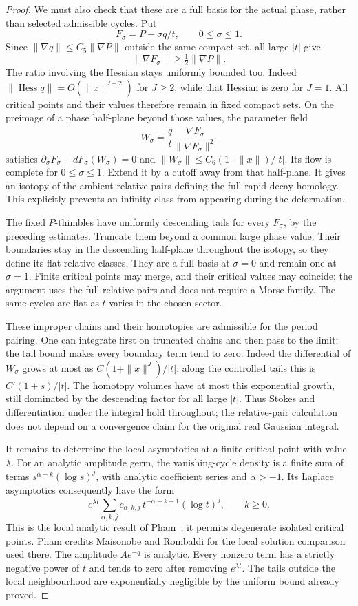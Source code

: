 \documentclass[11pt]{article}
\theoremstyle{definition}\newtheorem{definition}[theorem]{Definition}
\theoremstyle{remark}\newtheorem{remark}[theorem]{Remark}
\begin{document}
\begin{proof}
We must also check that these are a full basis for the actual phase,
rather than selected admissible cycles. Put
\[
 F_\sigma=P-\sigma q/t,\qquad 0\leq\sigma\leq1.
\]
Since $\|\nabla q\|\leq C_5\|\nabla P\|$ outside the same compact
set, all large $|t|$ give
\[
 \|\nabla F_\sigma\|\geq\tfrac12\|\nabla P\|.
\]
The ratio involving the Hessian stays uniformly bounded too. Indeed
$\|\operatorname{Hess}q\|=O(\|x\|^{J-2})$ for $J\geq2$, while
that Hessian is zero for $J=1$.
All critical points and their values therefore remain in fixed compact
sets. On the preimage of a phase half-plane beyond those values, the
parameter field
\[
 W_\sigma=\frac{q}{t}
       \frac{\overline{\nabla F_\sigma}}{\|\nabla F_\sigma\|^2}
\]
satisfies $\partial_\sigma F_\sigma+dF_\sigma(W_\sigma)=0$ and
$\|W_\sigma\|\leq C_6(1+\|x\|)/|t|$. Its flow is complete for
$0\leq\sigma\leq1$. Extend it by a cutoff away from that half-plane.
It gives an isotopy of the ambient relative pairs defining the full
rapid-decay homology. This explicitly prevents an infinity class
from appearing during the deformation.

The fixed $P$-thimbles have uniformly descending tails for every
$F_\sigma$, by the preceding estimates. Truncate them beyond a common
large phase value. Their boundaries stay in the descending half-plane
throughout the isotopy, so they define its flat relative classes.
They are a full basis at $\sigma=0$ and remain one at $\sigma=1$.
Finite critical points may merge, and their critical values may
coincide; the argument uses the full relative pairs and does not
require a Morse family. The same cycles are flat as $t$ varies in
the chosen sector.

These improper chains and their homotopies are admissible for the
period pairing. One can integrate first on truncated chains and then
pass to the limit: the tail bound makes every boundary term tend to
zero. Indeed the differential of $W_\sigma$ grows at most as
$C(1+\|x\|^J)/|t|$; along the controlled tails this is
$C'(1+s)/|t|$. The homotopy volumes have at most this exponential
growth, still dominated by the descending factor for all large $|t|$.
Thus Stokes and differentiation under the integral hold throughout;
the relative-pair calculation does not depend on a convergence claim
for the original real Gaussian integral.

It remains to determine the local asymptotics at a finite critical
point with value $\lambda$. For an analytic amplitude germ, the
vanishing-cycle density is a finite sum of terms
$s^{\alpha+k}(\log s)^j$, with analytic coefficient series and
$\alpha>-1$. Its Laplace asymptotics consequently have the form
\[
 e^{\lambda t}\sum_{\alpha,k,j}
       c_{\alpha,k,j}\,t^{-\alpha-k-1}(\log t)^j,
 \qquad k\geq0.
\]
This is the local analytic result of
Pham~\cite[Part~II, Section~1.1, (1.5)--(1.6) and the footnote on
printed page~26]{Pham}; it permits degenerate isolated critical
points. Pham credits Maisonobe and Rombaldi for the local solution
comparison used there. The amplitude $A e^{-q}$ is analytic. Every nonzero
term has a strictly negative power of $t$ and tends to zero after
removing $e^{\lambda t}$. The tails outside the local neighbourhood
are exponentially negligible by the uniform bound already proved.


\end{proof}
\end{document}
